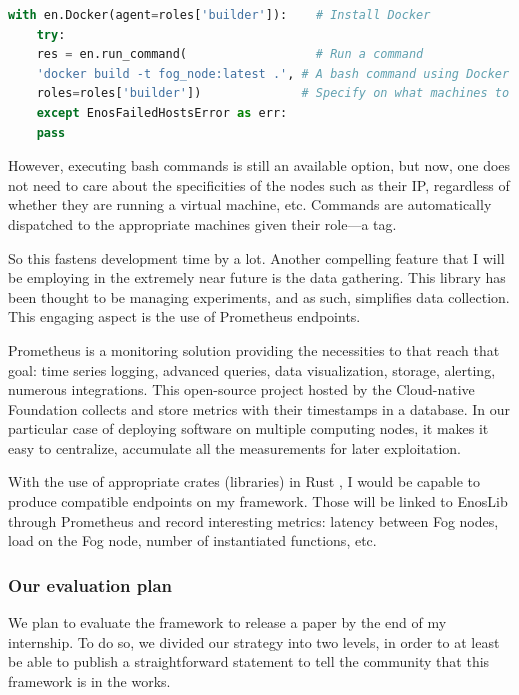 \begin{lstlisting}[language=Python, caption=EnosLib context example with Docker, label=listing:dockerenos]
	with en.Docker(agent=roles['builder']):    # Install Docker
	try:
	res = en.run_command(                  # Run a command
	'docker build -t fog_node:latest .', # A bash command using Docker
	roles=roles['builder'])              # Specify on what machines to act on
	except EnosFailedHostsError as err:
	pass
\end{lstlisting}

However, executing bash commands is still an available option, but now, one does not need to care about the specificities of the nodes such as their IP, regardless of whether they are running a virtual machine, etc. Commands are automatically dispatched to the appropriate machines given their role—a tag.

So this fastens development time by a lot. Another compelling feature that I will be employing in the extremely near future is the data gathering. This library has been thought to be managing experiments, and as such, simplifies data collection. This engaging aspect is the use of Prometheus endpoints.

Prometheus \cite{prometheus_authors_prometheus_nodate} is a monitoring solution providing the necessities to that reach that goal: time series logging, advanced queries, data visualization, storage, alerting, numerous integrations. This open-source project hosted by the Cloud-native Foundation collects and store metrics with their timestamps in a database. In our particular case of deploying software on multiple computing nodes, it makes it easy to centralize, accumulate all the measurements for later exploitation.

With the use of appropriate crates (libraries) in Rust \cite{sully_rocket_prometheus_2022}, I would be capable to produce compatible endpoints on my framework. Those will be linked to EnosLib through Prometheus and record interesting metrics: latency between Fog nodes, load on the Fog node, number of instantiated functions, etc.

\subsubsection{Our evaluation plan}

We plan to evaluate the framework to release a paper by the end of my internship. To do so, we divided our strategy into two levels, in order to at least be able to publish a straightforward statement to tell the community that this framework is in the works.

